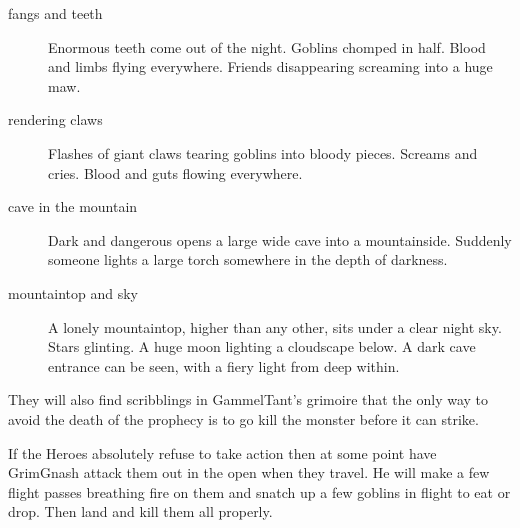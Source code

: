 \begin{description}
\item[fangs and teeth] Enormous teeth come out of the night. Goblins chomped in half. Blood and limbs flying everywhere. Friends disappearing screaming into a huge maw.
\item[rendering claws] Flashes of giant claws tearing goblins into bloody pieces. Screams and cries. Blood and guts flowing everywhere.
\item[cave in the mountain] Dark and dangerous opens a large wide cave into a mountainside. Suddenly someone lights a large torch somewhere in the depth of darkness.
\item[mountaintop and sky] A lonely mountaintop, higher than any other, sits under a clear night sky. Stars glinting. A huge moon lighting a cloudscape below. A dark cave entrance can be seen, with a fiery light from deep within.
\end{description}

They will also find scribblings in GammelTant's grimoire that the only way to avoid the death of the prophecy is to go kill the monster before it can strike.

If the Heroes absolutely refuse to take action then at some point have GrimGnash attack them out in the open when they travel. He will make a few flight passes breathing fire on them and snatch up a few goblins in flight to eat or drop. Then land and kill them all properly.




































